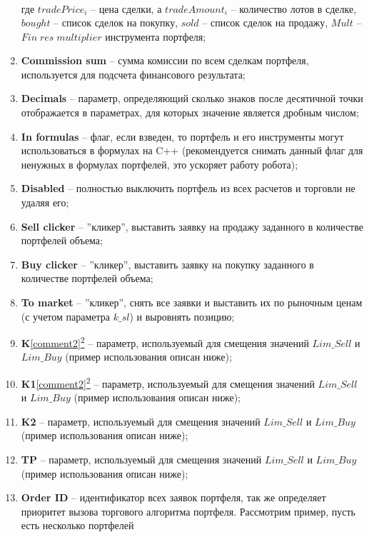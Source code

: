 \begin{enumerate}
\begin{align*}
		\end{align*} 
		где $tradePrice_i$ -- цена сделки, а $tradeAmount_i$ -- количество лотов в сделке, $bought$ -- список
		сделок на покупку, $sold$ -- список сделок на продажу, $Mult$ -- $Fin \; res \; multiplier$ инструмента портфеля;
	\item \textbf{Commission sum} -- сумма комиссии по всем сделкам портфеля, используется для подсчета финансового результата;
	\item \textbf{Decimals} -- параметр, определяющий сколько знаков после десятичной точки отображается в параметрах, для которых значение является дробным числом;
	\item \textbf{In formulas} -- флаг, если взведен, то портфель и его инструменты могут использоваться в формулах на C++ (рекомендуется снимать данный флаг для ненужных в формулах портфелей, это ускоряет работу робота);
	\item \textbf{Disabled} -- полностью выключить портфель из всех расчетов и торговли не удаляя его;
	\item \textbf{Sell clicker} -- ''кликер'', выставить заявку на продажу заданного в количестве портфелей объема;
	\item \textbf{Buy clicker} -- ''кликер'', выставить заявку на покупку заданного в количестве портфелей объема;
	\item \textbf{To market} -- ''кликер'', снять все заявки и выставить их по рыночным ценам (с учетом параметра $k\_sl$) и выровнять позицию;
	\item \textbf{K}\hyperref[comment2]{\ref{comment2}\textsuperscript{2}} -- параметр, используемый для смещения значений $Lim\_Sell$ и $Lim\_Buy$ (пример использования
		описан ниже);
	\item \textbf{K1}\hyperref[comment2]{\ref{comment2}\textsuperscript{2}} -- параметр, используемый для смещения значений $Lim\_Sell$ и $Lim\_Buy$ (пример использования
		описан ниже);
	\item \textbf{K2} -- параметр, используемый для смещения значений $Lim\_Sell$ и $Lim\_Buy$ (пример использования описан ниже);
	\item \textbf{TP} -- параметр, используемый для смещения значений $Lim\_Sell$ и $Lim\_Buy$ (пример использования описан ниже);
	\item \textbf{Order ID} -- идентификатор всех заявок портфеля, так же определяет приоритет вызова торгового алгоритма портфеля. Рассмотрим пример, пусть есть несколько портфелей

\end{enumerate}
